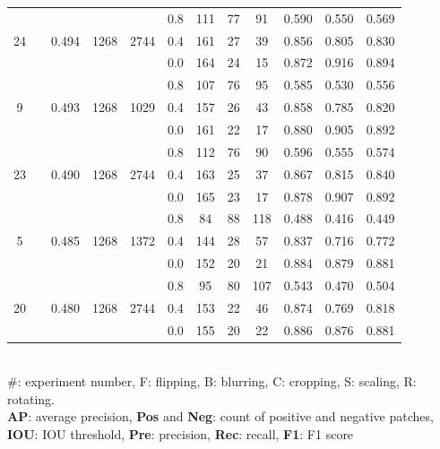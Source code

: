 \documentclass[authoryear,preprint,review,12pt]{elsarticle}
\begin{document}
\begin{table}
\begin{tabular}{c >{\centering\arraybackslash}m{2.2cm} c c  c ccc c c c c}
\multirow{3}{*}{24} &  \multirow{3}{*}{B, S, R} & \multirow{3}{*}{0.494 } & \multirow{3}{*}{1268} & \multirow{3}{*}{2744} &0.8 & 111 & 77 & 91 & 0.590  & 0.550  & 0.569 \\ [-1ex]
 &  & &  &   & 0.4 & 161 & 27 & 39 & 0.856  & 0.805  & 0.830 \\ [-1ex]
 &  & &  &   & 0.0 & 164 & 24 & 15 & 0.872  & 0.916  & 0.894 \\[-1ex]
\midrule
\multirow{3}{*}{9} &  \multirow{3}{*}{B} & \multirow{3}{*}{0.493 } & \multirow{3}{*}{1268} & \multirow{3}{*}{1029} &0.8 & 107 & 76 & 95 & 0.585  & 0.530  & 0.556 \\[-1ex]
 &  & &  &   & 0.4 & 157 & 26 & 43 & 0.858  & 0.785  & 0.820 \\[-1ex]
 &  & &  &   & 0.0 & 161 & 22 & 17 & 0.880  & 0.905  & 0.892 \\[-1ex]
\midrule
\multirow{3}{*}{23} &  \multirow{3}{*}{B, C, R} & \multirow{3}{*}{0.490 } & \multirow{3}{*}{1268} & \multirow{3}{*}{2744} &0.8 & 112 & 76 & 90 & 0.596  & 0.555  & 0.574 \\[-1ex]
 &  & &  &   & 0.4 & 163 & 25 & 37 & 0.867  & 0.815  & 0.840 \\[-1ex]
 &  & &  &   & 0.0 & 165 & 23 & 17 & 0.878  & 0.907  & 0.892 \\[-1ex]
\midrule
\multirow{3}{*}{5} &  \multirow{3}{*}{R} & \multirow{3}{*}{0.485 } & \multirow{3}{*}{1268} & \multirow{3}{*}{1372} &0.8 & 84 & 88 & 118 & 0.488  & 0.416  & 0.449 \\[-1ex]
 &  & &  &   & 0.4 & 144 & 28 & 57 & 0.837  & 0.716  & 0.772 \\[-1ex]
 &  & &  &   & 0.0 & 152 & 20 & 21 & 0.884  & 0.879  & 0.881 \\[-1ex]
\midrule
\multirow{3}{*}{20} &  \multirow{3}{*}{F, C, R} & \multirow{3}{*}{0.480 } & \multirow{3}{*}{1268} & \multirow{3}{*}{2744} &0.8 & 95 & 80 & 107 & 0.543  & 0.470  & 0.504 \\[-1ex]
 &  & &  &   & 0.4 & 153 & 22 & 46 & 0.874  & 0.769  & 0.818 \\[-1ex]
 &  & &  &   & 0.0 & 155 & 20 & 22 & 0.886  & 0.876  & 0.881 \\[-1ex]

\bottomrule
\end{tabular}
\raggedright \\ \#: experiment number, F: flipping, B: blurring, C: cropping, S: scaling, R: rotating.  \\\textbf{AP}: average precision, \textbf{Pos} and \textbf{Neg}: count of positive and negative patches, \textbf{IOU}: IOU threshold, \textbf{Pre}: precision, \textbf{Rec}: recall, \textbf{F1}: F1 score

\end{table}
\end{document}
